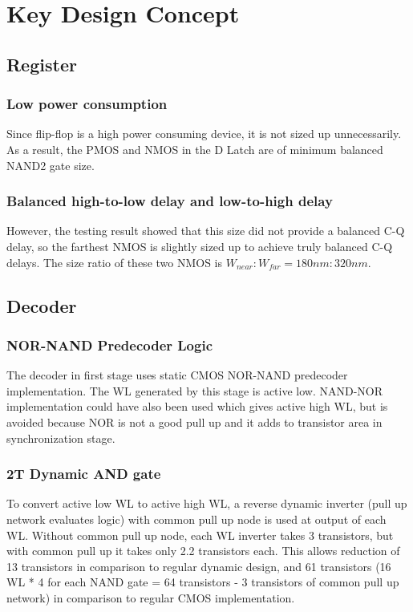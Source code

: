 \documentclass[conference]{IEEEtran}
\begin{document}
\section{Key Design Concept}
\subsection{Register}

\subsubsection{Low power consumption}
Since flip-flop is a high power consuming device, it is not sized up unnecessarily. As a result, the PMOS and NMOS in the D Latch are of minimum balanced NAND2 gate size.
\subsubsection{Balanced high-to-low delay and low-to-high delay}
However, the testing result showed that this size did not provide a balanced C-Q delay, so the farthest NMOS is slightly sized up to achieve truly balanced C-Q delays. The size ratio of these two NMOS is $W_{near}:W_{far}=180nm:320nm$.
\subsection{Decoder}
\subsubsection{NOR-NAND Predecoder Logic}
The decoder in first stage uses static CMOS NOR-NAND predecoder implementation. The WL generated by this stage is active low. NAND-NOR implementation could have also been used which gives active high WL, but is avoided because NOR is not a good pull up and it adds to transistor area in synchronization stage. 
\subsubsection{2T Dynamic AND gate}
To convert active low WL to active high WL, a reverse dynamic inverter (pull up network evaluates logic) with common pull up node is used at output of each WL. Without common pull up node, each WL inverter takes 3 transistors, but with common pull up it takes only 2.2 transistors each. This allows reduction of 13 transistors in comparison to regular dynamic design, and 61 transistors (16 WL * 4 for each NAND gate = 64 transistors - 3 transistors of common pull up network) in comparison to regular CMOS implementation.
\end{document}
